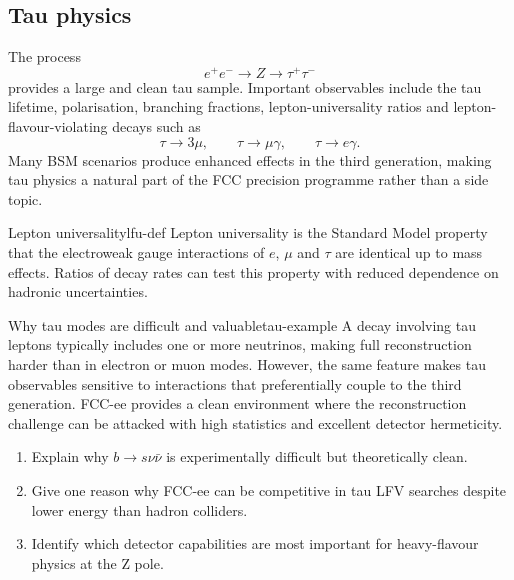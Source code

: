 \documentclass[11pt,a4paper]{article}
\numberwithin{equation}{section}
\begin{document}
\subsection{Tau physics}
The process
\begin{equation}
  e^+e^-\to Z\to \tau^+\tau^-
\end{equation}
provides a large and clean tau sample. Important observables include the tau lifetime, polarisation, branching fractions, lepton-universality ratios and lepton-flavour-violating decays such as
\begin{equation}
  \tau\to 3\mu,
  \qquad
  \tau\to \mu\gamma,
  \qquad
  \tau\to e\gamma .
\end{equation}
Many BSM scenarios produce enhanced effects in the third generation, making tau physics a natural part of the FCC precision programme rather than a side topic.

\begin{definition}{Lepton universality}{lfu-def}
Lepton universality is the Standard Model property that the electroweak gauge interactions of \(e\), \(\mu\) and \(\tau\) are identical up to mass effects. Ratios of decay rates can test this property with reduced dependence on hadronic uncertainties.
\end{definition}

\begin{examplebox}{Why tau modes are difficult and valuable}{tau-example}
A decay involving tau leptons typically includes one or more neutrinos, making full reconstruction harder than in electron or muon modes. However, the same feature makes tau observables sensitive to interactions that preferentially couple to the third generation. FCC-ee provides a clean environment where the reconstruction challenge can be attacked with high statistics and excellent detector hermeticity.
\end{examplebox}

\begin{guidedchecksbox}
\begin{enumerate}[leftmargin=1.6em]
\item Explain why \(b\to s\nu\bar\nu\) is experimentally difficult but theoretically clean.
\item Give one reason why FCC-ee can be competitive in tau LFV searches despite lower energy than hadron colliders.
\item Identify which detector capabilities are most important for heavy-flavour physics at the Z pole.
\end{enumerate}
\end{guidedchecksbox}
\end{document}
